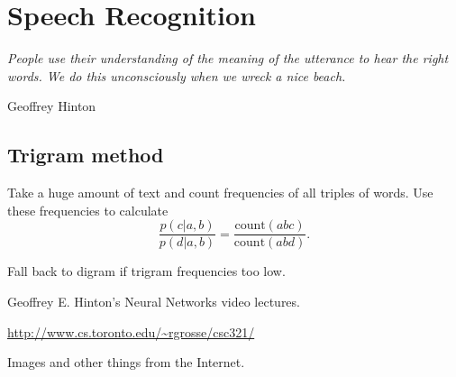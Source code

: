 \documentclass[12pt]{article}
\theoremstyle{plain}
\theoremstyle{definition}
\theoremstyle{remark}
\begin{document}
\section{Speech Recognition}

\epigraph{\textit{People use their understanding of the meaning of the utterance to hear the right words. We do this unconsciously when we wreck a nice beach.}}{Geoffrey Hinton}

\subsection{Trigram method}

Take a huge amount of text and count frequencies of all triples of words. Use these frequencies to calculate 
$$\frac{p(c|a,b)}{p(d|a,b)} = \frac{\mathrm{count}(abc)}{\mathrm{count}(abd)}.$$

Fall back to digram if trigram frequencies too low.

\begin{thebibliography}{99}

Geoffrey E. Hinton's Neural Networks video lectures.

\url{http://www.cs.toronto.edu/~rgrosse/csc321/}

Images and other things from the Internet.

\end{thebibliography}
\end{document}
